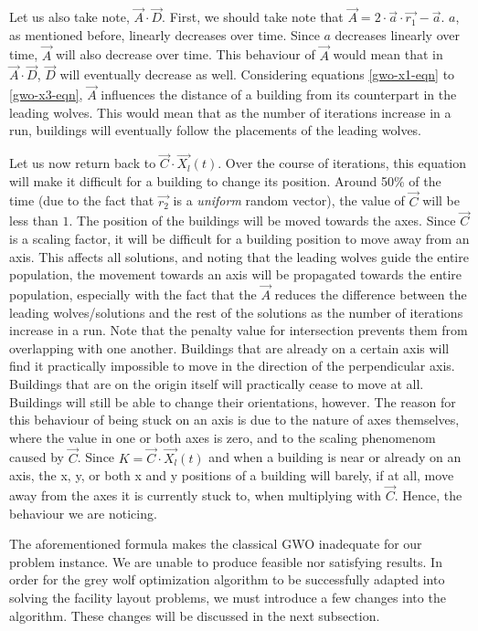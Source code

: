 Let us also take note, $\vec{A} \cdot \vec{D}$. First, we should take note that $\vec{A} = 2 \cdot \vec{a} \cdot \vec{r_{1}} - \vec{a}$. $a$, as mentioned before, linearly decreases over time. Since $a$ decreases linearly over time, $\vec{A}$ will also decrease over time. This behaviour of $\vec{A}$ would mean that in $\vec{A} \cdot \vec{D}$, $\vec{D}$ will eventually decrease as well. Considering equations \ref{gwo-x1-eqn} to \ref{gwo-x3-eqn}, $\vec{A}$ influences the distance of a building from its counterpart in the leading wolves. This would mean that as the number of iterations increase in a run, buildings will eventually follow the placements of the leading wolves.

Let us now return back to $\vec{C} \cdot \vec{X_{l}}(t)$. Over the course of iterations, this equation will make it difficult for a building to change its position. Around 50\% of the time (due to the fact that $\vec{r_{2}}$ is a \textit{uniform} random vector), the value of $\vec{C}$ will be less than $1$. The position of the buildings will be moved towards the axes. Since $\vec{C}$ is a scaling factor, it will be difficult for a building position to move away from an axis. This affects all solutions, and noting that the leading wolves guide the entire population, the movement towards an axis will be propagated towards the entire population, especially with the fact that the $\vec{A}$ reduces the difference between the leading wolves/solutions and the rest of the solutions as the number of iterations increase in a run. Note that the penalty value for intersection prevents them from overlapping with one another. Buildings that are already on a certain axis will find it practically impossible to move in the direction of the perpendicular axis. Buildings that are on the origin itself will practically cease to move at all. Buildings will still be able to change their orientations, however. The reason for this behaviour of being stuck on an axis is due to the nature of axes themselves, where the value in one or both axes is zero, and to the scaling phenomenom caused by $\vec{C}$. Since $K = \vec{C} \cdot \vec{X_{l}}(t)$ and when a building is near or already on an axis, the x, y, or both x and y positions of a building will barely, if at all, move away from the axes it is currently stuck to, when multiplying with $\vec{C}$. Hence, the behaviour we are noticing.

The aforementioned formula makes the classical GWO inadequate for our problem instance. We are unable to produce feasible nor satisfying results. In order for the grey wolf optimization algorithm to be successfully adapted into solving the facility layout problems, we must introduce a few changes into the algorithm. These changes will be discussed in the next subsection.


